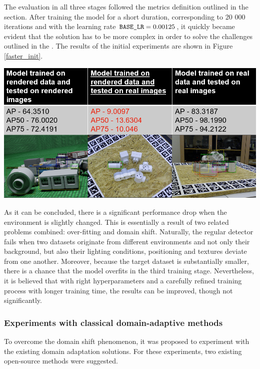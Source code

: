 The evaluation in all three stages followed the metrics definition outlined in the  section. After training the model for a short duration, corresponding to 20 000 iterations and with the learning rate $\texttt{BASE\textunderscore LR} = 0.00125$, it quickly became evident that the solution has to be more complex in order to solve the challenges outlined in the . The results of the initial experiments are shown in Figure \ref{faster_init}.


\begin{table}[htb]
	\begin{center}
		\includegraphics[width=14cm]{./initialExp.png}
	\end{center}
	\begin{center}
		\label{faster_init}
	\end{center}
\end{table}

As it can be concluded, there is a significant performance drop when the environment is slightly changed. This is essentially a result of two related problems combined: over-fitting and domain shift. Naturally, the regular detector fails when two datasets originate from different environments and not only their background, but also their lighting conditions, positioning and textures deviate from one another. Moreover, because the target dataset is substantially smaller, there is a chance that the model overfits in the third training stage. Nevertheless, it is believed that with right hyperparameters and a carefully refined training  process with longer training time, the results can be improved, though not significantly. 
\FloatBarrier

\subsubsection{Experiments with classical domain-adaptive methods}
To overcome the domain shift phenomenon, it was proposed to experiment with the existing domain adaptation solutions. For these experiments, two existing open-source methods were suggested. 

